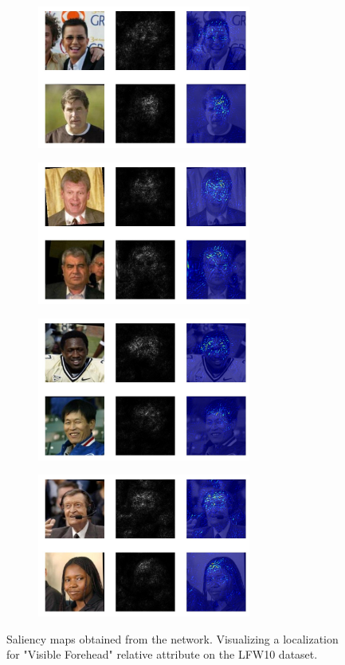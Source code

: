 \documentclass[10pt,twocolumn,letterpaper]{article}
\begin{document}
\begin{figure}
    \centering
    \begin{subfigure}
        \centering
        \includegraphics[width=7cm]{saliency-new/LFW/vforehead-1}
    \end{subfigure}
    \begin{subfigure}
        \centering
        \includegraphics[width=7cm]{saliency-new/LFW/vforehead-2}
    \end{subfigure}
    \begin{subfigure}
        \centering
        \includegraphics[width=7cm]{saliency-new/LFW/vforehead-4}
    \end{subfigure}
    \begin{subfigure}
        \centering
        \includegraphics[width=7cm]{saliency-new/LFW/vforehead-5}
    \end{subfigure}
    
    \caption{Saliency maps obtained from the network. Visualizing a localization for "Visible Forehead" relative attribute on the LFW10 dataset.}
    \label{sal.lfw.vforehead}
\end{figure}
\end{document}
